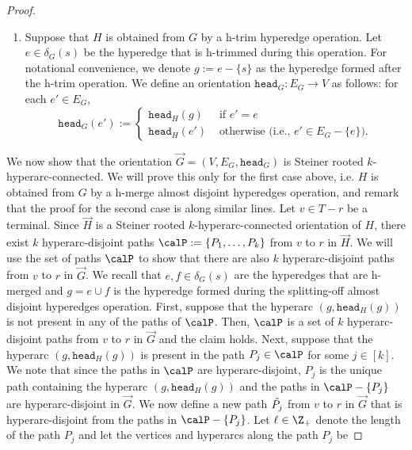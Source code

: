 \documentclass{article}
\newcommand{\knote}[1]{{\color{red}[{\tiny Karthik: \bf #1}]\marginpar{\color{red}*}}}
\newcommand{\head}{\ensuremath{\texttt{head}}\xspace}
\begin{document}
\begin{proof}
\begin{enumerate}
    \item Suppose that $H$ is obtained from $G$ 
    by a h-trim hyperedge operation. Let $e \in \delta_{G}(s)$ be the hyperedge that is h-trimmed during this operation. For notational convenience, we denote $g:= e - \{s\}$ as the hyperedge formed after the h-trim operation. We define an orientation $\head_{G}:E_G\rightarrow V$ as follows: for each $e' \in E_G$,
$$\head_{G}(e') := \begin{cases}
    \head_{H}(g)& \text{ if } e' = e\\
    \head_{H}(e')& \text{ otherwise (i.e., $e'\in E_G-\{e\}$).}
\end{cases}$$  
\end{enumerate}
        We now show that the orientation $\overrightarrow{G} = (V, E_G, \head_G)$ is Steiner rooted $k$-hyperarc-connected. We will prove this only for the first case above, i.e. $H$ is obtained from $G$ by a h-merge almost disjoint hyperedges operation, and remark that the proof for the second case is along similar lines. Let $v \in T - r$ be a terminal. Since $\overrightarrow{H}$ is a Steiner rooted $k$-hyperarc-connected orientation of $H$, there exist $k$ hyperarc-disjoint paths $\calP := \{P_1, \ldots, P_k\}$ 
        from $v$ to $r$ 
        in $\overrightarrow{H}$. We will use the set of paths $\calP$ to show that there are also $k$ hyperarc-disjoint paths 
        from $v$ to $r$ 
        in $\overrightarrow{G}$. We recall that $e, f \in \delta_G(s)$ are the hyperedges that are h-merged and $g = e \cup f $ is the hyperedge formed during the splitting-off almost disjoint hyperedges operation. First, suppose that the hyperarc $(g, \head_H(g))$ is not present in any of the paths of $\calP$. Then, $\calP$ is a set of $k$ hyperarc-disjoint paths 
        from $v$ to $r$ 
        in $\overrightarrow{G}$ and the claim holds. Next, suppose that the hyperarc $(g, \head_H(g))$ is present in the path $P_j \in \calP$ for some $j \in [k]$. We note that since the paths in $\calP$ are hyperarc-disjoint, $P_j$ is the unique path containing the hyperarc $(g, \head_H(g))$ and the paths in $\calP - \{P_j\}$ are hyperarc-disjoint in $\overrightarrow{G}$. We now define a new path $\Tilde{P_j}$ 
        from $v$ to $r$ 
        in $\overrightarrow{G}$ that is hyperarc-disjoint from the paths in $\calP - \{P_j\}$. Let $\ell \in \Z_+$ denote the length of the path $P_j$ and let the vertices and hyperarcs along the path $P_j$ be 

\end{proof}
\end{document}
